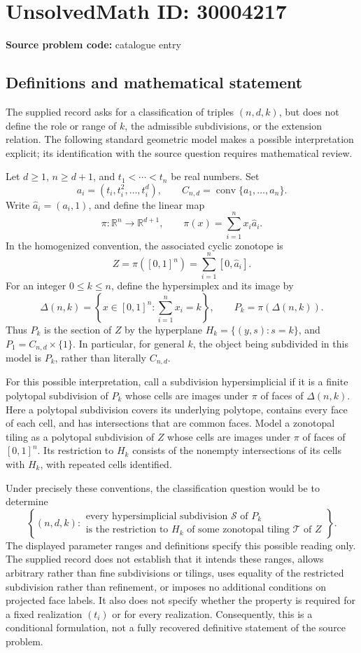 \documentclass[11pt]{article}
\newcommand{\R}{\mathbb{R}}
\begin{document}
\section*{UnsolvedMath ID: 30004217}
\textbf{Source problem code:} catalogue entry
\subsection{Definitions and mathematical statement}
The supplied record asks for a classification of triples \((n,d,k)\), but does not define the role or range of \(k\), the admissible subdivisions, or the extension relation. The following standard geometric model makes a possible interpretation explicit; its identification with the source question requires mathematical review.

Let \(d\geq 1\), \(n\geq d+1\), and \(t_1<\cdots<t_n\) be real numbers. Set
\[
 a_i=(t_i,t_i^2,\ldots,t_i^d),\qquad
 C_{n,d}=\operatorname{conv}\{a_1,\ldots,a_n\}.
\]
Write \(\widehat a_i=(a_i,1)\), and define the linear map
\[
 \pi:\R^n\longrightarrow\R^{d+1},\qquad
 \pi(x)=\sum_{i=1}^n x_i\widehat a_i.
\]
In the homogenized convention, the associated cyclic zonotope is
\[
 Z=\pi([0,1]^n)=\sum_{i=1}^n[0,\widehat a_i].
\]
For an integer \(0\leq k\leq n\), define the hypersimplex and its image by
\[
 \Delta(n,k)=\left\{x\in[0,1]^n:\sum_{i=1}^n x_i=k\right\},
 \qquad P_k=\pi(\Delta(n,k)).
\]
Thus \(P_k\) is the section of \(Z\) by the hyperplane \(H_k=\{(y,s):s=k\}\), and \(P_1=C_{n,d}\times\{1\}\). In particular, for general \(k\), the object being subdivided in this model is \(P_k\), rather than literally \(C_{n,d}\).

For this possible interpretation, call a subdivision hypersimplicial if it is a finite polytopal subdivision of \(P_k\) whose cells are images under \(\pi\) of faces of \(\Delta(n,k)\). Here a polytopal subdivision covers its underlying polytope, contains every face of each cell, and has intersections that are common faces. Model a zonotopal tiling as a polytopal subdivision of \(Z\) whose cells are images under \(\pi\) of faces of \([0,1]^n\). Its restriction to \(H_k\) consists of the nonempty intersections of its cells with \(H_k\), with repeated cells identified.

Under precisely these conventions, the classification question would be to determine
\[
 \left\{(n,d,k):
 \begin{array}{l}
 \text{every hypersimplicial subdivision }\mathcal S\text{ of }P_k\\
 \text{is the restriction to }H_k\text{ of some zonotopal tiling }\mathcal T\text{ of }Z
 \end{array}\right\}.
\]
The displayed parameter ranges and definitions specify this possible reading only. The supplied record does not establish that it intends these ranges, allows arbitrary rather than fine subdivisions or tilings, uses equality of the restricted subdivision rather than refinement, or imposes no additional conditions on projected face labels. It also does not specify whether the property is required for a fixed realization \((t_i)\) or for every realization. Consequently, this is a conditional formulation, not a fully recovered definitive statement of the source problem.
\end{document}

